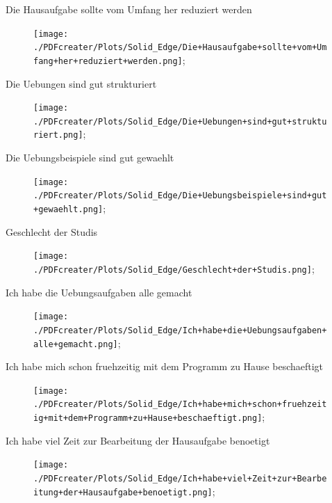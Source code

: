 \documentclass[10pt]{beamer}
\begin{document}
\begin{frame}[fragile]{Die Hausaufgabe sollte vom Umfang her reduziert werden} 
 \begin{figure}
 \texttt{[image: ./PDFcreater/Plots/Solid\_Edge/Die+Hausaufgabe+sollte+vom+Umfang+her+reduziert+werden.png]};
 \end{figure}
 \end{frame}
\begin{frame}[fragile]{Die Uebungen sind gut strukturiert} 
 \begin{figure}
 \texttt{[image: ./PDFcreater/Plots/Solid\_Edge/Die+Uebungen+sind+gut+strukturiert.png]};
 \end{figure}
 \end{frame}
\begin{frame}[fragile]{Die Uebungsbeispiele sind gut gewaehlt} 
 \begin{figure}
 \texttt{[image: ./PDFcreater/Plots/Solid\_Edge/Die+Uebungsbeispiele+sind+gut+gewaehlt.png]};
 \end{figure}
 \end{frame}
\begin{frame}[fragile]{Geschlecht der Studis} 
 \begin{figure}
 \texttt{[image: ./PDFcreater/Plots/Solid\_Edge/Geschlecht+der+Studis.png]};
 \end{figure}
 \end{frame}
\begin{frame}[fragile]{Ich habe die Uebungsaufgaben alle gemacht} 
 \begin{figure}
 \texttt{[image: ./PDFcreater/Plots/Solid\_Edge/Ich+habe+die+Uebungsaufgaben+alle+gemacht.png]};
 \end{figure}
 \end{frame}
\begin{frame}[fragile]{Ich habe mich schon fruehzeitig mit dem Programm zu Hause beschaeftigt} 
 \begin{figure}
 \texttt{[image: ./PDFcreater/Plots/Solid\_Edge/Ich+habe+mich+schon+fruehzeitig+mit+dem+Programm+zu+Hause+beschaeftigt.png]};
 \end{figure}
 \end{frame}
\begin{frame}[fragile]{Ich habe viel Zeit zur Bearbeitung der Hausaufgabe benoetigt} 
 \begin{figure}
 \texttt{[image: ./PDFcreater/Plots/Solid\_Edge/Ich+habe+viel+Zeit+zur+Bearbeitung+der+Hausaufgabe+benoetigt.png]};
 \end{figure}
 \end{frame}
\end{document}
